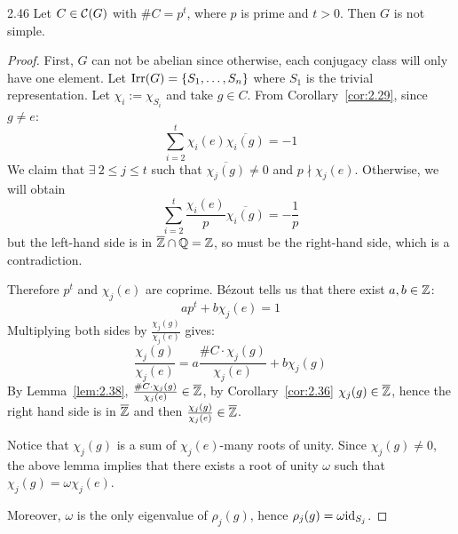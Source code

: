 \documentclass[twoside = false,	%
		headsepline,		%
		parskip = true,
		]{scrbook}						%
\begin{document}
    \begin{proposition}{}{2.46}
        Let $C \in \mathcal C(G)$ with $\#C = p^t$, where $p$ is prime and $t>0$. Then $G$ is not simple.
    \end{proposition}

    \begin{proof}
        First, $G$ can not be abelian since otherwise, each conjugacy class will only have one element.
        Let $\mathrm{Irr}(G) = \{S_1,\dots,S_n\}$ where $S_1$ is the trivial representation. Let $\chi_i := \chi_{S_i}$ and take $g \in C$.
        From Corollary~\ref{cor:2.29}, since $g \neq e$:
        \begin{equation*}
            \sum_{i=2}^t \chi_i(e) \overline{\chi_i(g)} = -1
        \end{equation*}
        We claim that $\exists \ 2 \leq j \leq t$ such that $\overline{\chi_j(g)} \neq 0$ and $p \nmid \chi_j(e)$. Otherwise, we will obtain
        \begin{equation*}
            \sum_{i=2}^t \frac{\chi_i(e)}{p} \overline{\chi_i(g)} = -\frac{1}{p}
        \end{equation*}
        but the left-hand side is in $\overline{\mathbb Z} \cap \mathbb Q = \mathbb Z$, so must be the right-hand side, which is a contradiction.

        Therefore $p^t$ and $\chi_j(e)$ are coprime. Bézout tells us that there exist $a,b \in \mathbb Z$:
        \begin{equation*}
            a p^t + b \chi_j(e) = 1
        \end{equation*}
        Multiplying both sides by $\frac{\chi_j(g)}{\chi_j(e)}$ gives:
        \begin{equation*}
            \frac{\chi_j(g)}{\chi_j(e)} = a \frac{\#C \cdot \chi_j(g)}{\chi_j(e)} + b \chi_j(g)
        \end{equation*}
        By Lemma~\ref{lem:2.38}, $\frac{\#C \cdot \chi_j(g)}{\chi_j(e)} \in \overline{\mathbb Z}$, by Corollary~\ref{cor:2.36} $\chi_j(g) \in \overline{\mathbb Z}$,
        hence the right hand side is in $\overline{\mathbb Z}$ and then $\frac{\chi_j(g)}{\chi_j(e)} \in \overline{\mathbb Z}$.

        Notice that $\chi_j(g)$ is a sum of $\chi_j(e)$-many roots of unity.
        Since $\chi_j(g) \neq 0$, the above lemma implies that there exists a root of unity $\omega$ such that $\chi_j(g) = \omega \chi_j(e)$.
        
        Moreover, $\omega$ is the only eigenvalue of $\rho_j(g)$, hence $\rho_j(g) = \omega \mathrm{id}_{S_j}$.


\end{proof}
\end{document}
